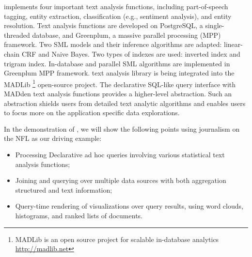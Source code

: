 {%

}


{\system} implements four important text analysis functions,  
including part-of-speech tagging, entity extraction, classification 
(e.g., sentiment analysis), and entity resolution.
Text analysis functions are developed on PostgreSQL, 
a single-threaded database, and Greenplum, a massive parallel 
processing (MPP) framework. 
Two SML models and their inference algorithms are adapted: linear-chain 
CRF and Naive Bayes\cite{Wang:2008:BML:1453856.1453896}. 
Two types of indexes are used: inverted index and trigram index. 
In-database and parallel SML algorithms are implemented in Greenplum MPP framework.
{\system} text analysis library is being integrated into the MADLib
\footnote{MADLib is an open source project for scalable in-database 
analytics \url{http://madlib.net}} 
open-source project.
The declarative SQL-like query interface with MADden text analysis functions 
provides a higher-level abstraction. Such an abstraction shields users from 
detailed text analytic algorithms and enables users to focus more on the 
application specific data explorations. 





In the demonstration of \system, we will show the 
following points using journalism on the NFL as our driving example:
\begin{itemize}[noitemsep]
\item Processing Declarative ad hoc queries involving various statistical text analysis functions;
\item Joining and querying over multiple data sources with both aggregation structured and text information;
\item Query-time rendering of visualizations over query results, using 
word clouds, histograms, and ranked lists of documents.
\end{itemize}

